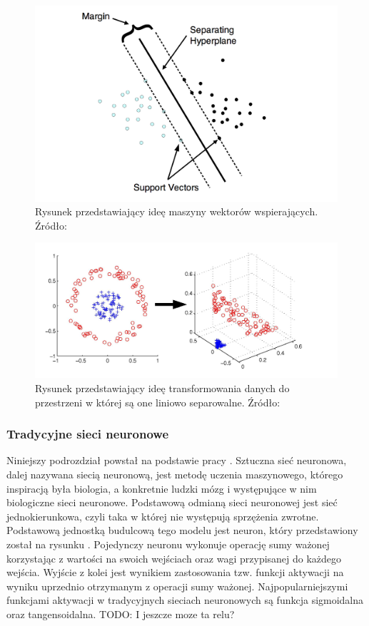 \begin{figure}[ht!]
\centering
\includegraphics[scale=0.8]{res/svm1.png}
\caption[Caption for LOF]{Rysunek przedstawiający ideę maszyny wektorów wspierających. Źródło:\cite{svm2} \label{svmIdea}}
\end{figure} 

\begin{figure}[ht!]
\centering
\includegraphics[scale=0.6]{res/svm2.png}
\caption[Caption for LOF]{Rysunek przedstawiający ideę transformowania danych do przestrzeni w której są one liniowo separowalne. Źródło:\cite{svmKernel} \label{svmKernel}}
\end{figure} 

\subsubsection{Tradycyjne sieci neuronowe}
Niniejszy podrozdział powstał na podstawie pracy \cite{tadeusiewicz}. Sztuczna sieć neuronowa, dalej nazywana siecią neuronową, jest metodę uczenia maszynowego, którego inspiracją była biologia, a konkretnie ludzki mózg i występujące w nim biologiczne sieci neuronowe. Podstawową odmianą sieci neuronowej jest sieć jednokierunkowa, czyli taka w której nie występują sprzężenia zwrotne. Podstawową jednostką budulcową tego modelu jest neuron, który przedstawiony został na rysunku \label{neuron}. Pojedynczy neuronu wykonuje operację sumy ważonej korzystając z wartości na swoich wejściach oraz wagi przypisanej do każdego wejścia. Wyjście z kolei jest wynikiem zastosowania tzw. funkcji aktywacji na wyniku uprzednio otrzymanym z operacji sumy ważonej. Najpopularniejszymi funkcjami aktywacji w tradycyjnych sieciach neuronowych są funkcja sigmoidalna oraz  tangensoidalna. TODO: I jeszcze moze ta relu?
 
